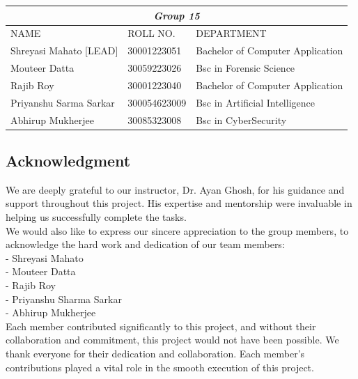 \documentclass{article}
\begin{document}
\begin{center}

\vspace{9 cm}
\renewcommand{\arraystretch}{2.5}
\hspace*{-2.25in}
\begin{tabular}{ |p{3cm}|p{4cm}|p{5cm}| }
\hline
\multicolumn{3}{|c|}{\Large \textbf{\textit{Group 15}}} \\
\hline
NAME & ROLL NO.& DEPARTMENT \\
\hline
Shreyasi Mahato [LEAD]& 30001223051& Bachelor of Computer Application \\
\hline
Mouteer Datta& 30059223026& Bsc in Forensic Science\\
\hline
Rajib Roy& 30001223040& Bachelor of Computer Application\\
\hline
Priyanshu Sarma Sarkar& 300054623009& Bsc in Artificial Intelligence\\
\hline
Abhirup Mukherjee& 30085323008& Bsc in CyberSecurity\\
\hline
\end{tabular}

\end{center}

\newpage
\begin{center}
    \section*{Acknowledgment}
\end{center}

We are deeply grateful to our instructor, Dr. Ayan Ghosh, for his guidance and support throughout this project. His expertise and mentorship were invaluable in helping us successfully complete the tasks.\\

We would also like to express our sincere appreciation to the group members, to acknowledge the hard work and dedication of our team members:\\

- Shreyasi Mahato\\
- Mouteer Datta\\
- Rajib Roy\\
- Priyanshu Sharma Sarkar\\
- Abhirup Mukherjee\\

Each member contributed significantly to this project, and without their collaboration and commitment, this project would not have been possible. We thank everyone for their dedication and collaboration. Each member's contributions played a vital role in the smooth execution of this project.\\
\end{document}
